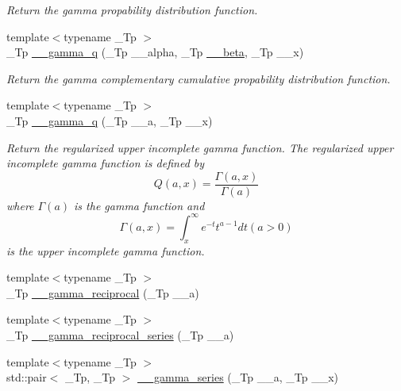 \begin{DoxyCompactItemize}
\begin{DoxyCompactList}\small\item\em Return the gamma propability distribution function. \end{DoxyCompactList}\item 
{\footnotesize template$<$typename \+\_\+\+Tp $>$ }\\\+\_\+\+Tp \hyperlink{namespacestd_1_1____detail_ad979441c8b26be7cfddb93db911743eb}{\+\_\+\+\_\+gamma\+\_\+q} (\+\_\+\+Tp \+\_\+\+\_\+alpha, \+\_\+\+Tp \hyperlink{namespacestd_1_1____detail_a090d2f0920e0d208c467609b2a81d717}{\+\_\+\+\_\+beta}, \+\_\+\+Tp \+\_\+\+\_\+x)
\begin{DoxyCompactList}\small\item\em Return the gamma complementary cumulative propability distribution function. \end{DoxyCompactList}\item 
{\footnotesize template$<$typename \+\_\+\+Tp $>$ }\\\+\_\+\+Tp \hyperlink{namespacestd_1_1____detail_a0ac19486073d0a7b2dc923b45b26777c}{\+\_\+\+\_\+gamma\+\_\+q} (\+\_\+\+Tp \+\_\+\+\_\+a, \+\_\+\+Tp \+\_\+\+\_\+x)
\begin{DoxyCompactList}\small\item\em Return the regularized upper incomplete gamma function. The regularized upper incomplete gamma function is defined by \[ Q(a,x) = \frac{\Gamma(a,x)}{\Gamma(a)} \] where $ \Gamma(a) $ is the gamma function and \[ \Gamma(a,x) = \int_x^\infty e^{-t}t^{a-1}dt (a > 0) \] is the upper incomplete gamma function. \end{DoxyCompactList}\item 
{\footnotesize template$<$typename \+\_\+\+Tp $>$ }\\\+\_\+\+Tp \hyperlink{namespacestd_1_1____detail_a8ac187fda39e0c55614e4c58146f871c}{\+\_\+\+\_\+gamma\+\_\+reciprocal} (\+\_\+\+Tp \+\_\+\+\_\+a)
\item 
{\footnotesize template$<$typename \+\_\+\+Tp $>$ }\\\+\_\+\+Tp \hyperlink{namespacestd_1_1____detail_a08dc6d850e2f02ff45deaa4772298cf3}{\+\_\+\+\_\+gamma\+\_\+reciprocal\+\_\+series} (\+\_\+\+Tp \+\_\+\+\_\+a)
\item 
{\footnotesize template$<$typename \+\_\+\+Tp $>$ }\\std\+::pair$<$ \+\_\+\+Tp, \+\_\+\+Tp $>$ \hyperlink{namespacestd_1_1____detail_aa480c595e1c5b894d76398cf0e8eb02b}{\+\_\+\+\_\+gamma\+\_\+series} (\+\_\+\+Tp \+\_\+\+\_\+a, \+\_\+\+Tp \+\_\+\+\_\+x)

\end{DoxyCompactItemize}
